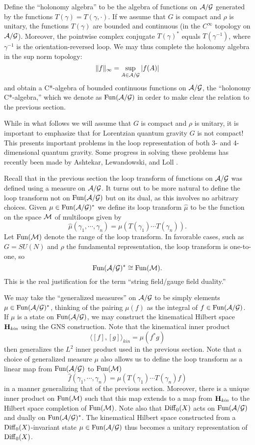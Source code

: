 \documentclass[12pt]{article}
\newcommand{\A}{{\cal A}}
\newcommand{\G}{{\cal G}}
\newcommand{\M}{{\cal M}}
\renewcommand{\H}{{\bf H}}
\newcommand{\Diff}{{\rm Diff}}
\newcommand{\Fun}{{\rm Fun}}
\begin{document}
Define the ``holonomy algebra'' to be the algebra of functions on
$\A/\G$ generated by the functions $T(\gamma) = T(\gamma,\cdot)$.
If we assume that $G$ is compact and $\rho$ is unitary, the functions
$T(\gamma)$ are bounded and continuous (in the $C^\infty$ topology on
$\A/\G$).  Moreover, the pointwise complex conjugate $T(\gamma)^\ast$ equals
$T(\gamma^{-1})$, where $\gamma^{-1}$ is the orientation-reversed
loop.  We may thus complete the holonomy algebra in the sup norm topology:
\[          \|f\|_\infty = \sup_{A \in \A/\G} |f(A)|  \]
and obtain a C*-algebra of bounded continuous functions on $\A/\G$,
the ``holonomy C*-algebra,'' which we denote as $\Fun(\A/\G)$ in order
to make clear the relation to the previous section.

While in what follows we will assume that $G$ is compact and $\rho$ is
unitary, it is important to emphasize that  for Lorentzian quantum gravity
$G$ is not compact!  This presents important problems in the loop
representation of both 3- and  4-dimensional quantum gravity.   Some
progress in solving these problems has recently been made by Ashtekar,
Lewandowski, and Loll \cite{AL,ALoll,Loll}.

Recall that in the previous section the loop transform of functions on
$\A/\G$ was defined using a measure on $\A/\G$.
It turns out to be more natural to define the loop transform not on
$\Fun(\A/\G)$ but on its dual, as this involves no arbitrary choices.
Given $\mu \in \Fun(\A/\G)^\ast$ we define its loop transform
$\hat\mu$ to be the function on the space $\M$ of multiloops given by
\[        \hat\mu(\gamma_1, \cdots, \gamma_n) =
 \mu(T(\gamma_1) \cdots T(\gamma_n))  .\]
Let $\Fun(\M)$ denote the range of the loop transform.  In favorable
cases, such as $G = SU(N)$ and $\rho$ the fundamental representation,
the loop transform is one-to-one, so
\[  \Fun(\A/\G)^\ast \cong \Fun(\M). \]
This is the real justification for the term ``string field/gauge field
duality.''

We may take the ``generalized measures'' on $\A/\G$ to be simply
elements $\mu \in \Fun(\A/\G)^\ast$, thinking of the pairing $\mu(f)$ as
the integral of $f \in \Fun(\A/\G)$.  If $\mu$ is a state on $\Fun(\A/\G)$, we
may construct the kinematical Hilbert space $\H_{\textit{kin}}$
using the GNS construction.  Note that the kinematical
inner product
\[          \langle [f], [g] \rangle_{kin} = \mu(f^\ast g)  \]
then generalizes the $L^2$ inner product used in
the previous section.  Note that a choice of generalized measure $\mu$
also allows us to define the loop transform as a linear map from
$\Fun(\A/\G)$ to $\Fun(\M)$
\[        \hat f(\gamma_1, \cdots, \gamma_n) =
\mu(T(\gamma_1) \cdots T(\gamma_n)f)  \]
in a manner generalizing that of the previous section.  Moreover,
there is a unique inner product on $\Fun(\M)$ such that this map
extends to a map from $\H_{\textit{kin}}$ to the Hilbert space completion of
$\Fun(\M)$.
Note also that $\Diff_0(X)$ acts on $\Fun(\A/\G)$
and dually on $\Fun(\A/\G)^\ast$.  The kinematical Hilbert space
constructed from a $\Diff_0(X)$-invariant state $\mu \in \Fun(\A/\G)$
thus becomes a unitary representation of $\Diff_0(X)$.
\end{document}

